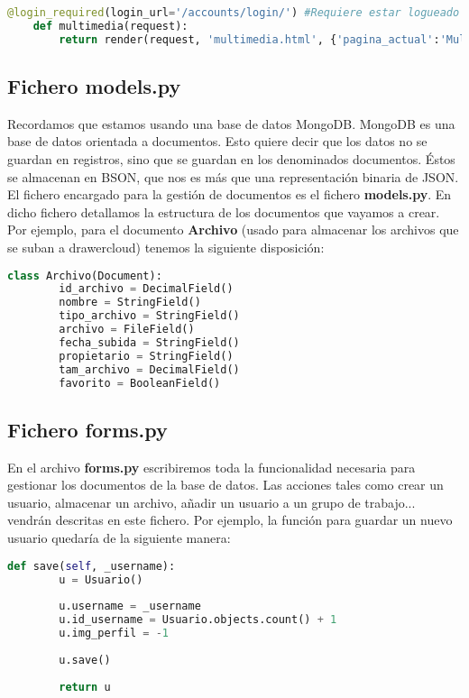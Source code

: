 \begin{lstlisting}[language=python]
	@login_required(login_url='/accounts/login/') #Requiere estar logueado para usar la funcion
	def multimedia(request):
		return render(request, 'multimedia.html', {'pagina_actual':'Multimedia'}) #Renderiza el fichero HTML multimedia.html
\end{lstlisting}

\subsection{Fichero models.py}
Recordamos que estamos usando una base de datos MongoDB. MongoDB es una base de datos orientada a documentos. Esto quiere decir que los datos no se guardan en registros, sino que se guardan en los denominados documentos. Éstos se almacenan en BSON, que nos es más que una representación binaria de JSON. \\

El fichero encargado para la gestión de documentos es el fichero \textbf{models.py}. En dicho fichero detallamos la estructura de los documentos que vayamos a crear. Por ejemplo, para el documento \textbf{Archivo} (usado para almacenar los archivos que se suban a drawercloud) tenemos la siguiente disposición: \\

\begin{lstlisting}[language=python]
	class Archivo(Document):
		id_archivo = DecimalField()
		nombre = StringField()
		tipo_archivo = StringField()
		archivo = FileField()
		fecha_subida = StringField()
		propietario = StringField()
		tam_archivo = DecimalField()
		favorito = BooleanField()
\end{lstlisting}


\subsection{Fichero forms.py}
En el archivo \textbf{forms.py} escribiremos toda la funcionalidad necesaria para gestionar los documentos de la base de datos. Las acciones tales como crear un usuario, almacenar un archivo, añadir un usuario a un grupo de trabajo... vendrán descritas en este fichero. Por ejemplo, la función para guardar un nuevo usuario quedaría de la siguiente manera: \\

\begin{lstlisting}[language=python]
	def save(self, _username):
		u = Usuario()
		
		u.username = _username
		u.id_username = Usuario.objects.count() + 1
		u.img_perfil = -1
		
		u.save()
		
		return u
\end{lstlisting}

